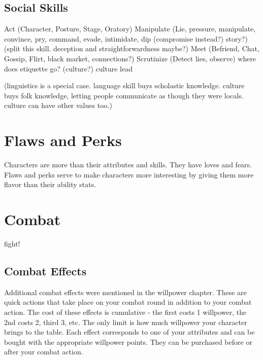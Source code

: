 \documentclass[twocolumn]{report}
\begin{document}
\section{Social Skills}
Act (Character, Posture, Stage, Oratory)
Manipulate (Lie, pressure, manipulate, convince, pry, command, evade, intimidate, dip (compromise instead?) story?) (split this skill.  deception and straightforwardness maybe?)
Meet (Befriend, Chat, Gossip, Flirt, black market, connections?)
Scrutinize (Detect lies, observe)
where does etiquette go? (culture?)
culture 
lead

(linguistics is a special case.  language skill buys scholastic knowledge.  culture buys folk knowledge, letting people communicate as though they were locals.  culture can have other values too.)


\chapter{Flaws and Perks}

Characters are more than their attributes and skills.  They have loves and fears.  Flaws and perks serve to make characters more interesting by giving them more flavor than their ability stats.

\chapter{Combat}

fight!
\section{Combat Effects}
Additional combat effects were mentioned in the willpower chapter.  These are quick actions that take place on your combat round in addition to your combat action.  The cost of these effects is cumulative - the first costs 1 willpower, the 2nd costs 2, third 3, etc.  The only limit is how much willpower your character brings to the table.  Each effect corresponds to one of your attributes and can be bought with the appropriate willpower points.  They can be purchased before or after your combat action.
\end{document}
